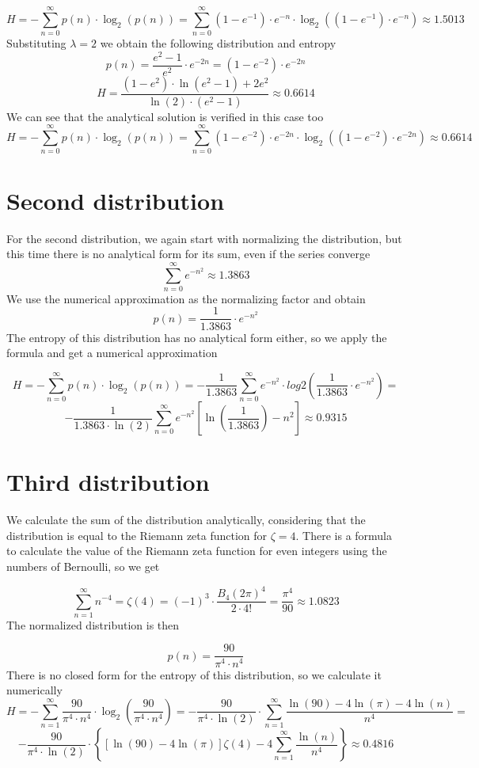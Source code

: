 \[
	H = - \sum_{n=0}^{\infty} p(n) \cdot \log_2(p(n)) =
	\sum_{n=0}^{\infty} (1 - e^{-1})\cdot e^{-n} \cdot
	\log_2((1 - e^{-1}) \cdot e^{-n}) \approx 1.5013
\]
Substituting $\lambda = 2$ we obtain the following distribution and entropy
\[
	p(n) = \frac{e^2 - 1}{e^2} \cdot e^{-2n} =
	(1 - e^{-2}) \cdot e^{-2n}
\]
\[
	H = \frac{(1 - e^2) \cdot \ln(e^2 - 1) + 2e^2}
	{\ln(2) \cdot (e^2 - 1)} \approx 0.6614
\]
We can see that the analytical solution is verified in this case too
\[
	H = - \sum_{n=0}^{\infty} p(n) \cdot \log_2(p(n)) =
	\sum_{n=0}^{\infty} (1 - e^{-2})\cdot e^{-2n} \cdot
	\log_2((1 - e^{-2}) \cdot e^{-2n}) \approx 0.6614
\]

\section{Second distribution}

For the second distribution, we again start with normalizing the distribution, but this time there is no analytical form for its sum, even if the series converge
\[
	\sum_{n=0}^{\infty} e^{-n^2} \approx 1.3863
\]
We use the numerical approximation as the normalizing factor and obtain
\[
	p(n) = \frac{1}{1.3863} \cdot e^{-n^2}
\]
The entropy of this distribution has no analytical form either, so we apply the formula and get a numerical approximation 

\[
	H = - \sum_{n=0}^{\infty} p(n) \cdot \log_2(p(n)) =
	- \frac{1}{1.3863} \sum_{n=0}^{\infty} e^{-n^2} \cdot 
	log2\left(\frac{1}{1.3863} \cdot e^{-n^2}\right) =
\]
\[
	- \frac{1}{1.3863 \cdot \ln(2)} \sum_{n=0}^{\infty} e^{-n^2} 
	 \left[ \ln \left(\frac{1}{1.3863}\right) - n^2 \right]
	 \approx 0.9315
\]

\section{Third distribution}

We calculate the sum of the distribution analytically, considering that the distribution is equal to the Riemann zeta function for $\zeta = 4$. There is a formula to calculate the value of the Riemann zeta function for even integers using the numbers of Bernoulli, so we get

\[ 
	\sum_{n=1}^{\infty} n^{-4} = \zeta(4) = 
	(-1)^{3} \cdot \frac{B_4(2\pi)^4}{2 \cdot 4!} = 
	\frac{\pi^4}{90} \approx 1.0823
\]
The normalized distribution is then

\[ 
	p(n) = \frac{90}{\pi^4 \cdot n^4}
\]
There is no closed form for the entropy of this distribution, so we calculate it numerically
\[
	H = - \sum_{n=1}^{\infty} \frac{90}{\pi^4 \cdot n^4} \cdot 
	\log_2\left(\frac{90}{\pi^4 \cdot n^4}\right) =
	- \frac{90}{\pi^4 \cdot \ln(2)} \cdot
	\sum_{n=1}^{\infty}
	\frac{\ln(90) - 4\ln(\pi) - 4\ln(n)} {n^4} = 
\]
\[ 
	- \frac{90}{\pi^4 \cdot \ln(2)} \cdot
	\left\{
	\left[ \ln(90) - 4\ln(\pi) \right] \zeta(4) -
	4 \sum_{n=1}^{\infty}
	\frac{\ln(n)}{n^4}
	\right\}
	\approx 0.4816
\]

